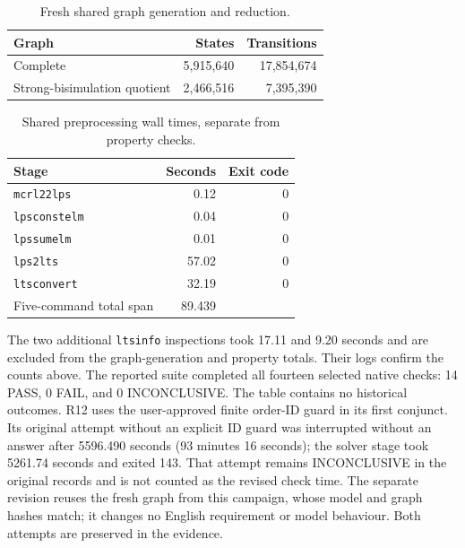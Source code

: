 \begin{table}[H]
\centering
\caption{Fresh shared graph generation and reduction.}\label{tab:graphresults}
\begin{tabular}{@{}lrr@{}}
\toprule Graph & States & Transitions \\ \midrule
Complete & 5,915,640 & 17,854,674 \\
Strong-bisimulation quotient & 2,466,516 & 7,395,390 \\
\bottomrule\end{tabular}
\end{table}
\begin{table}[H]
\centering
\caption{Shared preprocessing wall times, separate from property checks.}\label{tab:preprocessing}
\begin{tabular}{@{}lrr@{}}
\toprule Stage & Seconds & Exit code \\ \midrule
\texttt{mcrl22lps} & 0.12 & 0 \\
\texttt{lpsconstelm} & 0.04 & 0 \\
\texttt{lpssumelm} & 0.01 & 0 \\
\texttt{lps2lts} & 57.02 & 0 \\
\texttt{ltsconvert} & 32.19 & 0 \\
\midrule Five-command total span & 89.439 & \\
\bottomrule\end{tabular}
\end{table}
The two additional \texttt{ltsinfo} inspections took 17.11 and 9.20 seconds and are excluded from the graph-generation and property totals. Their logs confirm the counts above.
The reported suite completed all fourteen selected native checks: 14 PASS, 0 FAIL, and 0 INCONCLUSIVE. The table contains no historical outcomes.
R12 uses the user-approved finite order-ID guard in its first conjunct. Its original attempt without an explicit ID guard was interrupted without an answer after 5596.490 seconds (93 minutes 16 seconds); the solver stage took 5261.74 seconds and exited 143. That attempt remains INCONCLUSIVE in the original records and is not counted as the revised check time. The separate revision reuses the fresh graph from this campaign, whose model and graph hashes match; it changes no English requirement or model behaviour. Both attempts are preserved in the evidence.
\Needspace{300pt}
\begingroup\small
